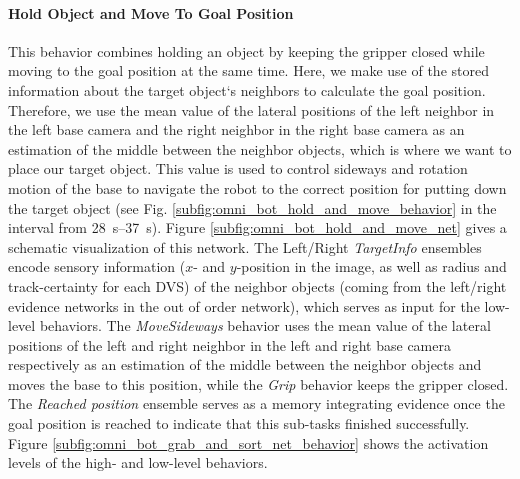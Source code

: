 \paragraph{Hold Object and Move To Goal Position} 
\label{holdmoveside}
This behavior combines holding an object by keeping the gripper closed while moving to the goal position at the same time. 
Here, we make use of the stored information about the target object`s neighbors to calculate the goal position. 
Therefore, we use the mean value of the lateral positions of the left neighbor in the left base camera and the right neighbor in the right base camera as an estimation of the middle between the neighbor objects, which is where we want to place our target object. 
This value is used to control sideways and rotation motion of the base to navigate the robot to the correct position for putting down the target object (see Fig. \ref{subfig:omni_bot_hold_and_move_behavior} in the interval from \SIrange{28}{37}{\second}). 
Figure \ref{subfig:omni_bot_hold_and_move_net} gives a schematic visualization of this network. 
The Left/Right \emph{TargetInfo} ensembles encode sensory information ($x$- and $y$-position in the image, as well as radius and track-certainty for each \ac{DVS}) of the neighbor objects (coming from the left/right evidence networks in the out of order network), which serves as input for the low-level behaviors.
The \emph{MoveSideways} behavior uses the mean value of the lateral positions of the left and right neighbor in the left and right base camera respectively as an estimation of the middle between the neighbor objects and moves the base to this position, while the \emph{Grip} behavior keeps the gripper closed.
The \emph{Reached position} ensemble serves as a memory integrating evidence once the goal position is reached to indicate that this sub-tasks finished successfully.
Figure \ref{subfig:omni_bot_grab_and_sort_net_behavior} shows the activation levels of the high- and low-level behaviors.

